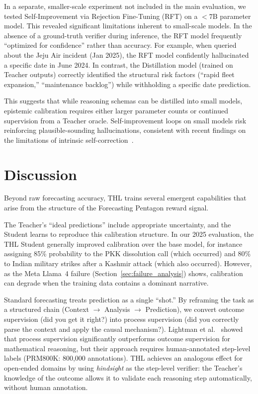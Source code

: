 \documentclass[11pt,a4paper]{article}
\begin{document}
In a separate, smaller-scale experiment not included in the main evaluation, we tested Self-Improvement via Rejection Fine-Tuning (RFT) on a $<7$B parameter model. This revealed significant limitations inherent to small-scale models. In the absence of a ground-truth verifier during inference, the RFT model frequently ``optimized for confidence'' rather than accuracy. For example, when queried about the Jeju Air incident (Jan 2025), the RFT model confidently hallucinated a specific date in June 2024. In contrast, the Distillation model (trained on Teacher outputs) correctly identified the structural risk factors (``rapid fleet expansion,'' ``maintenance backlog'') while withholding a specific date prediction.

This suggests that while reasoning schemas can be distilled into small models, epistemic calibration requires either larger parameter counts or continued supervision from a Teacher oracle. Self-improvement loops on small models risk reinforcing plausible-sounding hallucinations, consistent with recent findings on the limitations of intrinsic self-correction~\cite{huang2023selfcorrect}.

\section{Discussion}

Beyond raw forecasting accuracy, THL trains several emergent capabilities that arise from the structure of the Forecasting Pentagon reward signal.

The Teacher's ``ideal predictions'' include appropriate uncertainty, and the Student learns to reproduce this calibration structure. In our 2025 evaluation, the THL Student generally improved calibration over the base model, for instance assigning 85\% probability to the PKK dissolution call (which occurred) and 80\% to Indian military strikes after a Kashmir attack (which also occurred). However, as the Meta Llama~4 failure (Section~\ref{sec:failure_analysis}) shows, calibration can degrade when the training data contains a dominant narrative.

Standard forecasting treats prediction as a single ``shot.'' By reframing the task as a structured chain (Context $\to$ Analysis $\to$ Prediction), we convert outcome supervision (did you get it right?) into process supervision (did you correctly parse the context and apply the causal mechanism?). Lightman et al.~\cite{lightman2023lets} showed that process supervision significantly outperforms outcome supervision for mathematical reasoning, but their approach requires human-annotated step-level labels (PRM800K: 800,000 annotations). THL achieves an analogous effect for open-ended domains by using \textit{hindsight} as the step-level verifier: the Teacher's knowledge of the outcome allows it to validate each reasoning step automatically, without human annotation.
\end{document}
